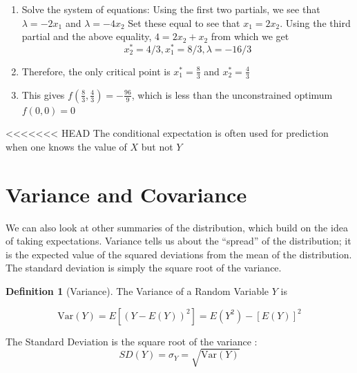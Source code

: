 \documentclass[]{book}
\theoremstyle{definition}
\newtheorem{definition}{Definition}[chapter]
\theoremstyle{definition}
\theoremstyle{definition}
\theoremstyle{remark}
\begin{document}
\begin{enumerate}
\def\labelenumi{\arabic{enumi}.}
\setcounter{enumi}{2}
\item
  Solve the system of equations: Using the first two partials, we see that \(\lambda = -2x_1\) and \(\lambda = -4x_2\)
  Set these equal to see that \(x_1 = 2x_2\).
  Using the third partial and the above equality, \(4 = 2x_2 + x_2\) from which we get \[x_2^* = 4/3, x_1^* = 8/3, \lambda = -16/3\]
\item
  Therefore, the only critical point is \(x_1^* = \frac{8}{3}\) and \(x_2^* = \frac{4}{3}\)
\item
  This gives \(f(\frac{8}{3}, \frac{4}{3}) = -\frac{96}{9}\), which is less than the unconstrained optimum \(f(0,0) = 0\)
\end{enumerate}

<<<<<<< HEAD
The conditional expectation is often used for prediction when one knows the value of \(X\) but not \(Y\)

\hypertarget{variance-and-covariance}{%
\section{Variance and Covariance}\label{variance-and-covariance}}

We can also look at other summaries of the distribution, which build on the idea of taking expectations. Variance tells us about the ``spread'' of the distribution; it is the expected value of the squared deviations from the mean of the distribution. The standard deviation is simply the square root of the variance.

\begin{definition}[Variance]
\protect\hypertarget{def:unnamed-chunk-84}{}{\label{def:unnamed-chunk-84} {} }The Variance of a Random Variable \(Y\) is

\[\text{Var}(Y) = E[(Y - E(Y))^2] =  E(Y^2)-[E(Y)]^2\]

The Standard Deviation is the square root of the variance : \[SD(Y) = \sigma_Y= \sqrt{\text{Var}(Y)}\]
\end{definition}
\end{document}
